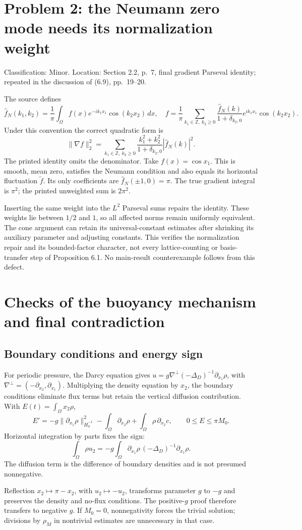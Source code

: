 \documentclass[10pt]{article}
\begin{document}
\section*{Problem 2: the Neumann zero mode needs its normalization weight}
Classification: Minor. Location: Section 2.2, p. 7, final gradient Parseval identity; repeated in the discussion of (6.9), pp. 19–20.\par
The source defines \[\widehat f_N(k_1,k_2)=\frac1\pi\int_\Omega
 f(x)e^{-ik_1x_1}\cos(k_2x_2)\,dx,
 \quad
 f=\frac1\pi\sum_{k_1\in\mathbb Z,\ k_2\ge0}
 \frac{\widehat f_N(k)}{1+\delta_{k_2,0}}e^{ik_1x_1}\cos(k_2x_2).\] Under this convention the correct quadratic form is \[\|\nabla f\|_2^2
 =\sum_{k_1\in\mathbb Z,\ k_2\ge0}
 \frac{k_1^2+k_2^2}{1+\delta_{k_2,0}}|\widehat f_N(k)|^2.\] The printed identity omits the denominator. Take \(f(x)=\cos x_1\). This is smooth, mean zero, satisfies the Neumann condition and also equals its horizontal fluctuation \(\widetilde f\). Its only coefficients are \(\widehat f_N(\pm1,0)=\pi\). The true gradient integral is \(\pi^2\); the printed unweighted sum is \(2\pi^2\).\par
Inserting the same weight into the \(L^2\) Parseval sums repairs the identity. These weights lie between \(1/2\) and \(1\), so all affected norms remain uniformly equivalent. The cone argument can retain its universal-constant estimates after shrinking its auxiliary parameter and adjusting constants. This verifies the normalization repair and its bounded-factor character, not every lattice-counting or basis-transfer step of Proposition 6.1. No main-result counterexample follows from this defect.\par
\section*{Checks of the buoyancy mechanism and final contradiction}
\subsection*{Boundary conditions and energy sign}
For periodic pressure, the Darcy equation gives \(u=g\nabla^\perp(-\Delta_D)^{-1}\partial_{x_1}\rho\), with \(\nabla^\perp=(-\partial_{x_2},\partial_{x_1})\). Multiplying the density equation by \(x_2\), the boundary conditions eliminate flux terms but retain the vertical diffusion contribution. With \(E(t)=\int_\Omega x_2\rho\), \[E'=-g\|\partial_{x_1}\rho\|_{\dot H^{-1}_0}^2
       -\int_\Omega\partial_{x_2}\rho
       +\int_\Omega\rho\,\partial_{x_2}c,
 \qquad 0\le E\le\pi M_0.\] Horizontal integration by parts fixes the sign: \[\int_\Omega\rho u_2
 =-g\int_\Omega\partial_{x_1}\rho\,(-\Delta_D)^{-1}\partial_{x_1}\rho.\] The diffusion term is the difference of boundary densities and is not presumed nonnegative.\par
Reflection \(x_2\mapsto\pi-x_2\), with \(u_2\mapsto-u_2\), transforms parameter \(g\) to \(-g\) and preserves the density and no-flux conditions. The positive-\(g\) proof therefore transfers to negative \(g\). If \(M_0=0\), nonnegativity forces the trivial solution; divisions by \(\rho_M\) in nontrivial estimates are unnecessary in that case.\par
\end{document}
